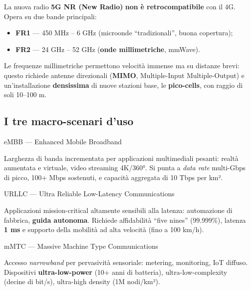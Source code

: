 \documentclass[
  italian,
  openany]{book}
\providecommand{\tightlist}{%
  \setlength{\itemsep}{0pt}\setlength{\parskip}{0pt}}
\begin{document}
La nuova radio \textbf{5G NR (New Radio)} \textbf{non è
retrocompatibile} con il 4G. Opera su due bande principali:

\begin{itemize}
\tightlist
\item
  \textbf{FR1} --- 450 MHz -- 6 GHz (microonde ``tradizionali'', buona
  copertura);
\item
  \textbf{FR2} --- 24 GHz -- 52 GHz (\textbf{onde millimetriche},
  mmWave).
\end{itemize}

Le frequenze millimetriche permettono velocità immense ma su distanze
brevi: questo richiede antenne direzionali (\textbf{MIMO},
Multiple-Input Multiple-Output) e un'installazione \textbf{densissima}
di nuove stazioni base, le \textbf{pico-cells}, con raggio di soli
10--100 m.

\subsection{I tre macro-scenari d'uso}\label{i-tre-macro-scenari-duso}

\begin{callouttip}{eMBB — Enhanced Mobile Broadband}

Larghezza di banda incrementata per applicazioni multimediali pesanti:
realtà aumentata e virtuale, video streaming 4K/360°. Si punta a
\emph{data rate} multi-Gbps di picco, 100+ Mbps sostenuti, e capacità
aggregata di 10 Tbps per km².

\end{callouttip}

\begin{callouttip}{URLLC — Ultra Reliable Low-Latency Communications}

Applicazioni mission-critical altamente sensibili alla latenza:
automazione di fabbrica, \textbf{guida autonoma}. Richiede affidabilità
``five nines'' (99.999\%), latenza \textbf{1 ms} e supporto della
mobilità ad alta velocità (fino a 100 km/h).

\end{callouttip}

\begin{callouttip}{mMTC — Massive Machine Type Communications}

Accesso \emph{narrowband} per pervasività sensoriale: metering,
monitoring, IoT diffuso. Dispositivi \textbf{ultra-low-power} (10+ anni
di batteria), ultra-low-complexity (decine di bit/s), ultra-high density
(1M nodi/km²).

\end{callouttip}
\end{document}
